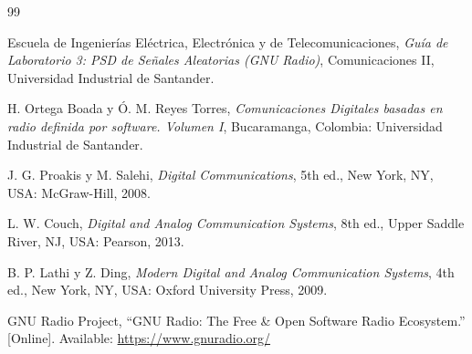 \begin{thebibliography}{99}

Escuela de Ingenierías Eléctrica, Electrónica y de Telecomunicaciones,
\textit{Guía de Laboratorio 3: PSD de Señales Aleatorias (GNU Radio)},
Comunicaciones II, Universidad Industrial de Santander.

H. Ortega Boada y Ó. M. Reyes Torres,
\textit{Comunicaciones Digitales basadas en radio definida por software. Volumen I},
Bucaramanga, Colombia: Universidad Industrial de Santander.

J. G. Proakis y M. Salehi,
\textit{Digital Communications},
5th ed., New York, NY, USA: McGraw-Hill, 2008.

L. W. Couch,
\textit{Digital and Analog Communication Systems},
8th ed., Upper Saddle River, NJ, USA: Pearson, 2013.

B. P. Lathi y Z. Ding,
\textit{Modern Digital and Analog Communication Systems},
4th ed., New York, NY, USA: Oxford University Press, 2009.

GNU Radio Project,
``GNU Radio: The Free \& Open Software Radio Ecosystem.''
[Online]. Available: \url{https://www.gnuradio.org/}

\end{thebibliography}